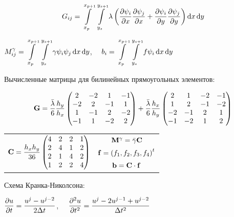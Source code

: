 $$ G_{ij} = \int\limits_{x_p}^{x_{p+1}}\int\limits_{y_s}^{y_{s+1}} \lambda\left(\frac{\partial \psi_i}{\partial x}\frac{\partial \psi_j}{\partial x} + \frac{\partial \psi_i}{\partial y}\frac{\partial \psi_j}{\partial y}\right) \operatorname{d}\!x \operatorname{d}\!y $$

\begin{center}
$\displaystyle M_{ij}^\gamma = \int\limits_{x_p}^{x_{p+1}}\int\limits_{y_s}^{y_{s+1}} \gamma \psi_i \psi_j \operatorname{d}\!x \operatorname{d}\!y $, $\displaystyle \quad b_i = \int\limits_{x_p}^{x_{p+1}}\int\limits_{y_s}^{y_{s+1}} f \psi_i \operatorname{d}\!x \operatorname{d}\!y $
\end{center}

Вычисленные матрицы для билинейных прямоугольных элементов:

$$ \mathbf{G} = \frac{\bar{\lambda}}{6}\frac{h_y}{h_x}\begin{pmatrix}
2 & -2 & 1 & -1 \\
-2 & 2 & -1 & 1 \\
1 & -1 & 2 & -2 \\
-1 & 1 & -2 & 2
\end{pmatrix} + \frac{\bar{\lambda}}{6}\frac{h_x}{h_y}\begin{pmatrix}
2 & 1 & -2 & -1 \\
1 & 2 & -1 & -2 \\
-2 & -1 & 2 & 1 \\
-1 & -2 & 1 & 2
\end{pmatrix} $$

\begin{center}
\begin{tabular}{cc}
\multirow{3}{*}{$\displaystyle \mathbf{C} = \frac{h_x h_y}{36}\begin{pmatrix}
4 & 2 & 2 & 1 \\
2 & 4 & 1 & 2 \\
2 & 1 & 4 & 2 \\
1 & 2 & 2 & 4
\end{pmatrix} $} & $ \mathbf{M}^\gamma = \bar{\gamma}\mathbf{C} $ \\[1.25ex]
& $ \mathbf{f} = \left(f_1, f_2, f_3, f_4\right)^t $ \\[1.25ex]
& $ \mathbf{b} = \mathbf{C}\cdot \mathbf{f} $
\end{tabular}
\end{center}

Схема Кранка-Николсона:

\begin{center}
$\displaystyle \frac{\partial u}{\partial t} = \frac{u^j-u^{j-2}}{2\Delta t} $, $\displaystyle \quad \frac{\partial^{2} u}{\partial t^{2}} = \frac{u^j-2u^{j-1}+u^{j-2}}{\Delta t^2} $
\end{center}

